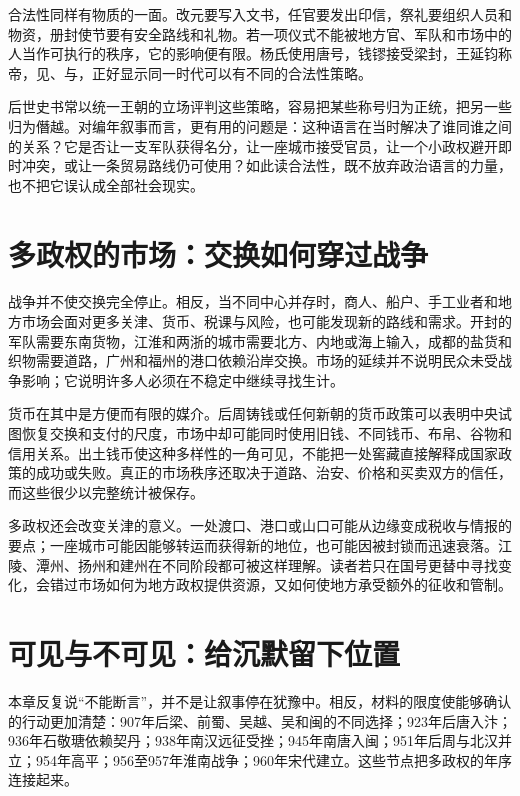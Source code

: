 合法性同样有物质的一面。改元要写入文书，任官要发出印信，祭礼要组织人员和物资，册封使节要有安全路线和礼物。若一项仪式不能被地方官、军队和市场中的人当作可执行的秩序，它的影响便有限。杨氏使用唐号，钱镠接受梁封，王延钧称帝，见、与，正好显示同一时代可以有不同的合法性策略。

后世史书常以统一王朝的立场评判这些策略，容易把某些称号归为正统，把另一些归为僭越。对编年叙事而言，更有用的问题是：这种语言在当时解决了谁同谁之间的关系？它是否让一支军队获得名分，让一座城市接受官员，让一个小政权避开即时冲突，或让一条贸易路线仍可使用？如此读合法性，既不放弃政治语言的力量，也不把它误认成全部社会现实。

\section{多政权的市场：交换如何穿过战争}

战争并不使交换完全停止。相反，当不同中心并存时，商人、船户、手工业者和地方市场会面对更多关津、货币、税课与风险，也可能发现新的路线和需求。开封的军队需要东南货物，江淮和两浙的城市需要北方、内地或海上输入，成都的盐货和织物需要道路，广州和福州的港口依赖沿岸交换。市场的延续并不说明民众未受战争影响；它说明许多人必须在不稳定中继续寻找生计。

货币在其中是方便而有限的媒介。后周铸钱或任何新朝的货币政策可以表明中央试图恢复交换和支付的尺度，市场中却可能同时使用旧钱、不同钱币、布帛、谷物和信用关系。出土钱币使这种多样性的一角可见，不能把一处窖藏直接解释成国家政策的成功或失败。真正的市场秩序还取决于道路、治安、价格和买卖双方的信任，而这些很少以完整统计被保存。

多政权还会改变关津的意义。一处渡口、港口或山口可能从边缘变成税收与情报的要点；一座城市可能因能够转运而获得新的地位，也可能因被封锁而迅速衰落。江陵、潭州、扬州和建州在不同阶段都可被这样理解。读者若只在国号更替中寻找变化，会错过市场如何为地方政权提供资源，又如何使地方承受额外的征收和管制。

\section{可见与不可见：给沉默留下位置}

本章反复说“不能断言”，并不是让叙事停在犹豫中。相反，材料的限度使能够确认的行动更加清楚：907年后梁、前蜀、吴越、吴和闽的不同选择；923年后唐入汴；936年石敬瑭依赖契丹；938年南汉远征受挫；945年南唐入闽；951年后周与北汉并立；954年高平；956至957年淮南战争；960年宋代建立。这些节点把多政权的年序连接起来。

